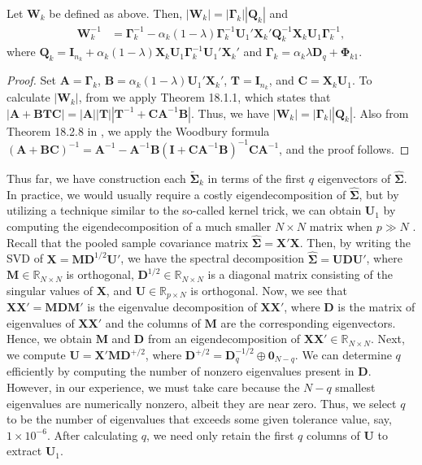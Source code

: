 \documentclass[11pt]{article}
\begin{document}
\begin{proposition}\label{proposition:rda-W_k}
Let $\bm W_k$ be defined as above. Then, $|\bm W_k| = |\bm \Gamma_k| |\bm Q_k|$ and
	\begin{align}
		\bm W_k^{-1} &= \bm \Gamma_k^{-1} - \alpha_k(1 - \lambda) \bm \Gamma_k^{-1} \bm U_1' \bm X_k' \bm Q_k^{-1} \bm X_k \bm U_1 \bm \Gamma_k^{-1},
	\end{align}
where $\bm Q_k = \bm I_{n_k} + \alpha_k(1- \lambda) \bm X_k \bm U_1 \bm \Gamma_k^{-1} \bm U_1' \bm X_k'$ and $\bm \Gamma_k = \alpha_k \lambda \bm D_q + \bm \Phi_{k1}$.
\end{proposition}
\begin{proof}
	Set $\bm A = \bm \Gamma_k$, $\bm B = \alpha_k (1 - \lambda) \bm U_1' \bm X_k'$, $\bm T = \bm I_{n_k}$, and $\bm C = \bm X_k \bm U_1$. To calculate $|\bm W_k|$, from \cite{Harville:2008wja} we apply Theorem 18.1.1, which states that $|\bm A + \bm B \bm T \bm C| = |\bm A| |\bm T| |\bm T^{-1} + \bm C \bm A^{-1} \bm B|$. Thus, we have $|\bm W_k| = |\bm \Gamma_k| |\bm Q_k|$. Also from Theorem 18.2.8 in \cite{Harville:2008wja}, we apply the Woodbury formula $(\bm A + \bm B \bm C)^{-1} = \bm A^{-1} - \bm A^{-1} \bm B(\bm I + \bm C \bm A^{-1} \bm B)^{-1} \bm C \bm A^{-1}$, and the proof follows.
\end{proof}

Thus far, we have construction each $\tilde{\bm \Sigma}_k$ in terms of the first $q$ eigenvectors of $\widehat{\bm \Sigma}$. In practice, we would usually require a costly eigendecomposition of $\widehat{\bm \Sigma}$, but by utilizing a technique similar to the so-called kernel trick, we can obtain $\bm U_1$ by computing the eigendecomposition of a much smaller $N \times N$ matrix when $p \gg N$ \citep{Hastie:2008dt}. Recall that the pooled sample covariance matrix $\widehat{\bm\Sigma} = \bm X' \bm X$. Then, by writing the SVD of $\bm X = \bm M \bm D^{1/2} \bm U'$, we have the spectral decomposition $\widehat{\bm\Sigma} = \bm U \bm D \bm U'$, where $\bm M \in \mathbb{R}_{N \times N}$ is orthogonal, $\bm D^{1/2} \in \mathbb{R}_{N \times N}$ is a diagonal matrix consisting of the singular values of $\bm X$, and $\bm U \in \mathbb{R}_{p \times N}$ is orthogonal. Now, we see that $\bm X \bm X' = \bm M \bm D \bm M'$ is the eigenvalue decomposition of $\bm X \bm X'$, where $\bm D$ is the matrix of eigenvalues of $\bm X \bm X'$ and the columns of $\bm M$  are the corresponding eigenvectors. Hence, we obtain $\bm M$ and $\bm D$ from an eigendecomposition of $\bm X \bm X' \in \mathbb{R}_{N \times N}$. Next, we compute $\bm U = \bm X' \bm M \bm D^{+/2}$, where $\bm D^{+/2} = \bm D_q^{-1/2} \oplus \bm 0_{N-q}$. We can determine $q$ efficiently by computing the number of nonzero eigenvalues present in $\bm D$. However, in our experience, we must take care because the $N-q$ smallest eigenvalues are numerically nonzero, albeit they are near zero. Thus, we select $q$ to be the number of eigenvalues that exceeds some given tolerance value, say, $1 \times 10^{-6}$. After calculating $q$, we need only retain the first $q$ columns of $\bm U$ to extract $\bm U_1$.
\end{document}
